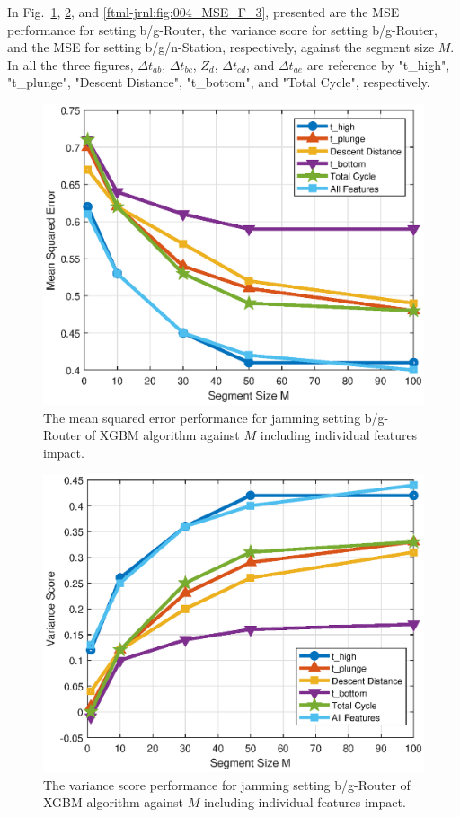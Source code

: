 In Fig.~\ref{ftml-jrnl:fig:001_MSE_F_3}, \ref{ftml-jrnl:fig:001_R2_F_3}, and \ref{ftml-jrnl:fig:004_MSE_F_3}, presented are the MSE performance for setting b/g-Router, the variance score for setting b/g-Router, and the MSE for setting b/g/n-Station, respectively, against the segment size $M$. In all the three figures, $\Delta{t}_{ab}$, $\Delta{t}_{bc}$, $Z_d$, $\Delta{t}_{cd}$, and $\Delta{t}_{ae}$ are reference by "t\_high", "t\_plunge", "Descent Distance", "t\_bottom", and "Total Cycle", respectively. 

\begin{figure}[!ht]
	\centering
	\includegraphics[width=0.75\columnwidth]{./chapter-ftml/plots/001_MSE_F_3.eps}
	\caption{The mean squared error performance for jamming setting b/g-Router of XGBM algorithm against $M$ including individual features impact.}
	\label{ftml-jrnl:fig:001_MSE_F_3}      
\end{figure}

\begin{figure}[!ht]
	\centering
	\includegraphics[width=0.75\columnwidth]{./chapter-ftml/plots/001_R2_F_3.eps}
	\caption{The variance score performance for jamming setting b/g-Router of XGBM algorithm against $M$ including individual features impact.}
	\label{ftml-jrnl:fig:001_R2_F_3}      
\end{figure}

